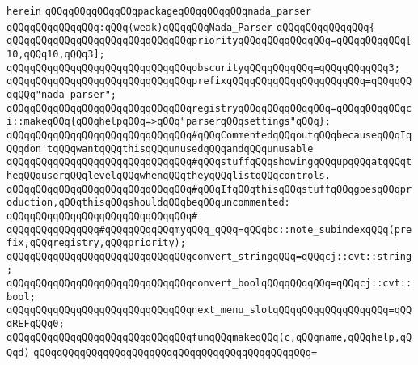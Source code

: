 \verb|herein|\newline
\newline
\verb|qQQqqQQqqQQqqQQqpackageqQQqqQQqqQQqnada_parser|\newline
\verb|qQQqqQQqqQQqqQQq:qQQq(weak)qQQqqQQqNada_Parser|\newline
\verb|qQQqqQQqqQQqqQQq{|\newline
\verb|qQQqqQQqqQQqqQQqqQQqqQQqqQQqqQQqpriorityqQQqqQQqqQQqqQQq=qQQqqQQqqQQq[10,qQQq10,qQQq3];|\newline
\verb|qQQqqQQqqQQqqQQqqQQqqQQqqQQqqQQqobscurityqQQqqQQqqQQq=qQQqqQQqqQQq3;|\newline
\verb|qQQqqQQqqQQqqQQqqQQqqQQqqQQqqQQqprefixqQQqqQQqqQQqqQQqqQQqqQQq=qQQqqQQqqQQq"nada_parser";|\newline
\newline
\verb|qQQqqQQqqQQqqQQqqQQqqQQqqQQqqQQqregistryqQQqqQQqqQQqqQQq=qQQqqQQqqQQqci::makeqQQq{qQQqhelpqQQq=>qQQq"parserqQQqsettings"qQQq};|\newline
\newline
\newline
\verb|qQQqqQQqqQQqqQQqqQQqqQQqqQQqqQQq#qQQqCommentedqQQqoutqQQqbecauseqQQqIqQQqdon'tqQQqwantqQQqthisqQQqunusedqQQqandqQQqunusable|\newline
\verb|qQQqqQQqqQQqqQQqqQQqqQQqqQQqqQQq#qQQqstuffqQQqshowingqQQqupqQQqatqQQqtheqQQquserqQQqlevelqQQqwhenqQQqtheyqQQqlistqQQqcontrols.|\newline
\verb|qQQqqQQqqQQqqQQqqQQqqQQqqQQqqQQq#qQQqIfqQQqthisqQQqstuffqQQqgoesqQQqproduction,qQQqthisqQQqshouldqQQqbeqQQquncommented:|\newline
\verb|qQQqqQQqqQQqqQQqqQQqqQQqqQQqqQQq#|\newline
\verb|qQQqqQQqqQQqqQQq#qQQqqQQqqQQqmyqQQq_qQQq=qQQqbc::note_subindexqQQq(prefix,qQQqregistry,qQQqpriority);|\newline
\newline
\verb|qQQqqQQqqQQqqQQqqQQqqQQqqQQqqQQqconvert_stringqQQq=qQQqcj::cvt::string;|\newline
\verb|qQQqqQQqqQQqqQQqqQQqqQQqqQQqqQQqconvert_boolqQQqqQQqqQQq=qQQqcj::cvt::bool;|\newline
\newline
\verb|qQQqqQQqqQQqqQQqqQQqqQQqqQQqqQQqnext_menu_slotqQQqqQQqqQQqqQQqqQQq=qQQqREFqQQq0;|\newline
\newline
\verb|qQQqqQQqqQQqqQQqqQQqqQQqqQQqqQQqfunqQQqmakeqQQq(c,qQQqname,qQQqhelp,qQQqd)|\newline
\verb|qQQqqQQqqQQqqQQqqQQqqQQqqQQqqQQqqQQqqQQqqQQqqQQq=|\newline
